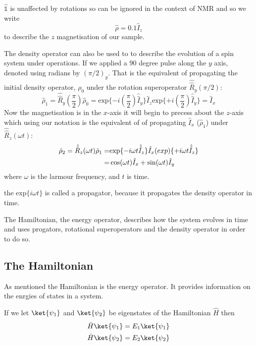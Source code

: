 $\hat{\mathbb{1}}$ is unaffected by rotations so can be ignored in the context of NMR
and so we write
\begin{equation}
  \hat{\rho} = 0.1\hat{I}_z
\end{equation}
to describe the $z$ magnetisation of our sample.

The density operator can also be used to to describe the evolution of a spin system under operations. If we applied a $90$ degree pulse along the $y$ axis, denoted using radians by $(\pi/2)_y$. That is the equivalent of propagating the initial density operator, $\rho_0$
under the rotation superoperator $\hat{\hat{R}}_y(\pi/2)$:
\begin{equation}
  \hat{\rho}_1 = \hat{\hat{R}}_y(\frac{\pi}{2})\hat\rho_0 = \text{exp}\{-i(\frac{\pi}{2})\hat{\hat{I}}_y\}\hat{I}_z\text{exp}\{+i(\frac{\pi}{2})\hat{\hat{I}}_y\} = \hat{I}_x
\end{equation}
Now the magnetisation is in the $x$-axis it will begin to precess about the $z$-axis which using our notation is the equivalent of of propagating $\hat{I}_x$ ($\hat{\rho}_1$)
under $\hat{\hat{R}}_z(\omega t)$:
\begin{align}\label{eqn:propagate}
  \hat{\rho}_2 = \hat{\hat{R}}_z(\omega t)\hat{\rho}_1 =& \text{exp}\{-i\omega t\hat{\hat{I}}_z\}\hat{I}_x\text(exp)\{+i\omega t\hat{\hat{I}}_z\}\\
   =& \cos(\omega t)\hat{I}_x + \sin(\omega t)\hat{I}_y
\end{align}
where $\omega$ is the larmour frequency, and $t$ is time.

the $\text{exp}\{i\omega t\}$ is called a propagator, because it propagates the density operator in time.

The Hamiltonian, the energy operator, describes how the system evolves in time and uses progators, rotational superoperators and the density operator in order to do so.

\subsection{The Hamiltonian}

As mentioned the Hamiltonian is the energy operator. It provides information on the enrgies of states in a system.

If we let $\ket{\psi_1}$ and $\ket{\psi_2}$ be eigenstates of the Hamiltonian $\hat{H}$ then
\begin{align}
  \hat{H}\ket{\psi_1} = E_1\ket{\psi_1}\\
  \hat{H}\ket{\psi_2} = E_2\ket{\psi_2}
\end{align}

